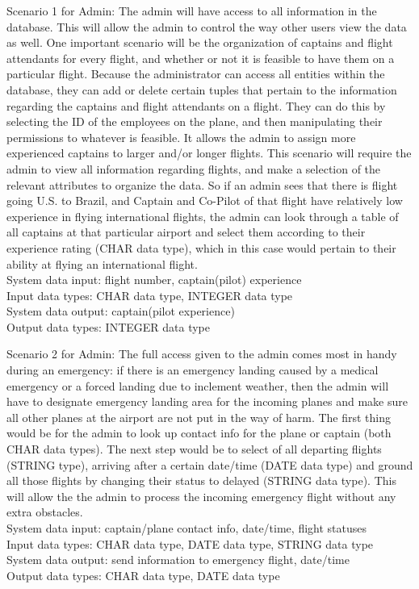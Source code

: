 \documentclass[10pt,conference]{IEEEtran}
\begin{document}
\vspace{5mm}
Scenario 1 for Admin:
The admin will have access to all information in the database. This will allow the admin to control the way other users view the data as well. One important scenario will be the organization of captains and flight attendants for every flight, and whether or not it is feasible to have them on a particular flight. Because the administrator can access all entities within the database, they can add or delete certain tuples that pertain to the information regarding the captains and flight attendants on a flight. They can do this by selecting the ID of the employees on the plane, and then manipulating their permissions to whatever is feasible. It allows the admin to assign more experienced captains to larger and/or longer flights. This scenario will require the admin to view all information regarding flights, and make a selection of the relevant attributes to organize the data.
So if an admin sees that there is flight going U.S. to Brazil, and Captain and Co-Pilot of that flight have relatively low experience in flying international flights, the admin can look through a table of all captains at that particular airport and select them according to their experience rating (CHAR data type), which in this case would pertain to their ability at flying an international flight.
 \vspace{5mm}\\System data input: flight number, captain(pilot) experience
\\
Input data types: CHAR data type, INTEGER data type\\
System data output: captain(pilot experience) \\
Output data types: INTEGER data type




\vspace{5mm}
Scenario 2 for Admin:
The full access given to the admin comes most in handy during an emergency: if there is an emergency landing caused by a medical emergency or a forced landing due to inclement weather, then the admin will have to designate emergency landing area for the incoming planes and make sure all other planes at the airport are not put in the way of harm. 
The first thing would be for the admin to look up contact info for the plane or captain (both CHAR data types). The next step would be to select of all departing flights (STRING type), arriving after a certain date/time (DATE data type) and ground all those flights by changing their status to delayed (STRING data type). This will allow the the admin to process the incoming emergency flight without any extra obstacles.  \vspace{5mm}\\System data input: captain/plane contact info, date/time, flight statuses
\\
Input data types: CHAR data type, DATE data type, STRING data type
\\
System data output: send information to emergency flight, date/time\\
Output data types: CHAR data type, DATE data type
\end{document}
